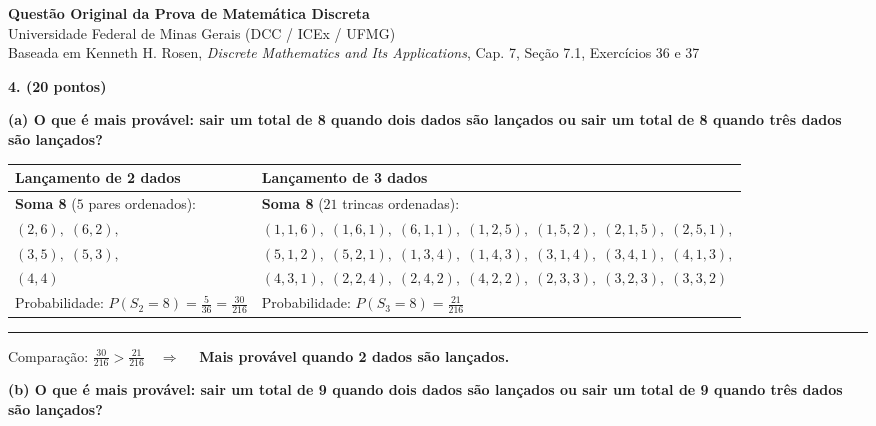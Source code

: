 \documentclass[10pt,a4paper]{article}
\begin{document}
\begin{center}
    {\Large \textbf{Questão Original da Prova de Matemática Discreta}}\\[0.2em]
    {\normalsize Universidade Federal de Minas Gerais (DCC / ICEx / UFMG)}\\[0.15em]
    {\footnotesize Baseada em Kenneth H. Rosen, \textit{Discrete Mathematics and Its Applications}, Cap. 7, Seção 7.1, Exercícios 36 e 37}
\end{center}

\vspace{0.2em}

\textbf{4. (20 pontos)}

\textbf{(a) O que é mais provável: sair um total de 8 quando dois dados são lançados ou sair um total de 8 quando três dados são lançados?}

\begin{exambox}[title={Resolução combinatória por contagem direta (conforme folha de prova)}]
\renewcommand{\arraystretch}{1.2}
\begin{tabularx}{\textwidth}{@{}p{}|X@{}}
\textbf{Lançamento de 2 dados} & \textbf{Lançamento de 3 dados} \\
\hline
\textbf{Soma 8} ($5$ pares ordenados): &
\textbf{Soma 8} ($21$ trincas ordenadas): \\
$(2,6),\; (6,2),$ &
$(1,1,6),\; (1,6,1),\; (6,1,1),\; (1,2,5),\; (1,5,2),\; (2,1,5),\; (2,5,1),$ \\
$(3,5),\; (5,3),$ &
$(5,1,2),\; (5,2,1),\; (1,3,4),\; (1,4,3),\; (3,1,4),\; (3,4,1),\; (4,1,3),$ \\
$(4,4)$ &
$(4,3,1),\; (2,2,4),\; (2,4,2),\; (4,2,2),\; (2,3,3),\; (3,2,3),\; (3,3,2)$ \\[0.35em]
Probabilidade: $\displaystyle P(S_2 = 8) = \frac{5}{36} = \frac{30}{216}$ &
Probabilidade: $\displaystyle P(S_3 = 8) = \frac{21}{216}$
\end{tabularx}

\vspace{0.35em}
\hrule
\vspace{0.35em}
\centering
Comparação: \quad
$\displaystyle \boxed{\frac{30}{216}} > \frac{21}{216} \quad \Longrightarrow \quad$
\textbf{Mais provável quando 2 dados são lançados.}
\end{exambox}

\vspace{0.25em}

\textbf{(b) O que é mais provável: sair um total de 9 quando dois dados são lançados ou sair um total de 9 quando três dados são lançados?}
\end{document}
